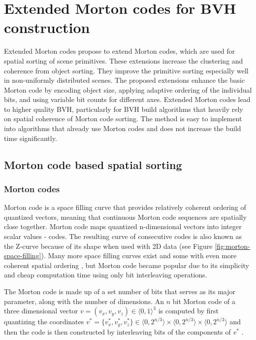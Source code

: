 \clearpage
\section{Extended Morton codes for BVH construction}

Extended Morton codes \cite{Vinkler2017} propose to extend Morton codes, which are used for spatial sorting of scene primitives. These extensions increase the clustering and coherence from object sorting. They improve the primitive sorting especially well in non-uniformly distributed scenes. The proposed extensions enhance the basic Morton code by encoding object size, applying adaptive ordering of the individual bits, and using variable bit counts for different axes. Extended Morton codes lead to higher quality BVH, particularly for BVH build algorithms that heavily rely on spatial coherence of Morton code sorting. The method is easy to implement into algorithms that already use Morton codes and does not increase the build time significantly.

\subsection{Morton code based spatial sorting}

\subsubsection{Morton codes}

Morton code is a space filling curve that provides relatively coherent ordering of quantized vectors, meaning that continuous Morton code sequences are spatially close together. Morton code maps quantized n-dimensional vectors into integer scalar values - codes. The resulting curve of consecutive codes is also known as the Z-curve because of its shape when used with 2D data (see Figure \ref{fig:morton-space-filling}). Many more space filling curves exist and some with even more coherent spatial ordering \cite{Samet2006}, but Morton code became popular due to its simplicity and cheap computation time using only bit interleaving operations.

The Morton code is made up of a set number of bits that serves as its major parameter, along with the number of dimensions. An \(n\) bit Morton code of a three dimensional vector $v = (v_x, v_y, v_z) \in \langle 0, 1 \rangle^3$ is computed by first quantizing the coordinates $v^* = \{ v^*_x, v^*_y, v^*_z \} \in \langle 0,2^{n/3} \rangle \times \langle 0,2^{n/3} \rangle \times \langle 0,2^{n/3} \rangle$ and then the code is then constructed by interleaving bits of the components of $v^*$ \cite{Vinkler2017}. 

